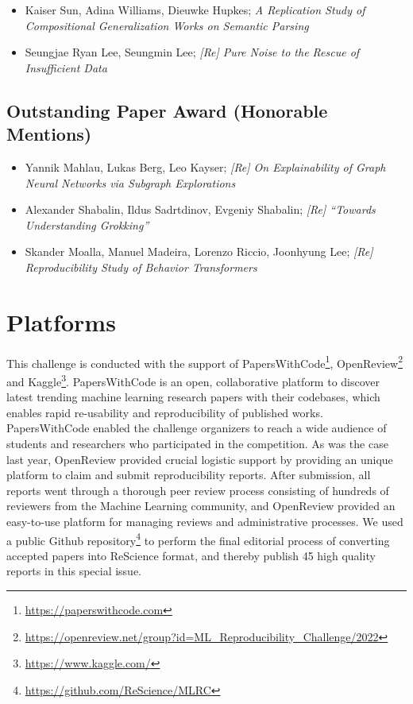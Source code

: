 \begin{itemize}
    \item Kaiser Sun, Adina Williams, Dieuwke Hupkes; \textit{	
A Replication Study of Compositional Generalization Works on Semantic Parsing}
    \item Seungjae Ryan Lee, Seungmin Lee; \textit{[Re] Pure Noise to the Rescue of Insufficient Data}
\end{itemize}

\subsection{Outstanding Paper Award (Honorable Mentions)}

\begin{itemize}
  \item Yannik Mahlau, Lukas Berg, Leo Kayser; \textit{	
[Re] On Explainability of Graph Neural Networks via Subgraph Explorations}
  \item Alexander Shabalin, Ildus Sadrtdinov, Evgeniy Shabalin; \textit{[Re] “Towards Understanding Grokking”}
  \item Skander Moalla, Manuel Madeira, Lorenzo Riccio, Joonhyung Lee; \textit{[Re] Reproducibility Study of Behavior Transformers}
\end{itemize}

\section{Platforms}

This challenge is conducted with the support of PapersWithCode\footnote{\url{https://paperswithcode.com}}, OpenReview\footnote{\url{https://openreview.net/group?id=ML_Reproducibility_Challenge/2022}} and Kaggle\footnote{\url{https://www.kaggle.com/}}. PapersWithCode is an open, collaborative platform to discover latest trending machine learning research papers with their codebases, which enables rapid re-usability and reproducibility of published works. PapersWithCode enabled the challenge organizers to reach a wide audience
of students and researchers who participated in the competition. As was the case last year, OpenReview provided crucial logistic support by providing an unique platform to claim and submit reproducibility reports. After submission, all reports went through a thorough peer review process consisting of hundreds of reviewers from the Machine Learning
community, and OpenReview provided an easy-to-use platform for managing reviews and administrative processes. We used a public Github repository\footnote{\url{https://github.com/ReScience/MLRC}} to perform the final editorial process of converting accepted papers into ReScience format, and thereby publish 45 high quality reports in this special issue.

